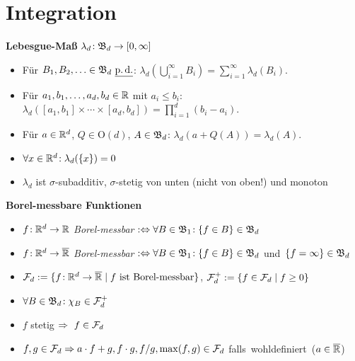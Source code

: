 \section{Integration}

\textbf{Lebesgue-Maß} $\lambda_d\!: \mathfrak{B}_d \to [0,\infty]$
\begin{itemize}
\item Für $B_1,B_2,\ldots\in\B_d\ \pd$:\:
  $\lambda_d(\bigcup_{i=1}^{\infty} B_i) = \sum_{i=1}^{\infty} \lambda_d(B_i)$.

\item Für $a_1,b_1,\ldots,a_d,b_d\in\mathbb{R}$ mit $a_i \leq b_i$:\:\:
  \mbox{$\lambda_d([a_1,b_1] \times\cdots\times [a_d,b_d]) =
  \prod_{i=1}^{d} (b_i-a_i)$.}

\item Für $a\in\mathbb{R}^d$, $Q\in\mathrm{O}(d)$, $A\in\mathfrak{B}_d$:
  $\lambda_d(a+Q(A)) = \lambda_d(A)$.

\item $\forall x\in\mathbb{R}^d\!: \lambda_d(\{x\}) = 0$

\item $\lambda_d$ ist $\sigma$-subadditiv, $\sigma$-stetig von unten
  (nicht von oben!) und monoton
\end{itemize}

\textbf{Borel-messbare Funktionen}
\begin{itemize}
\item $f\!: \mathbb{R}^d\to\mathbb{R}$ \textit{Borel-messbar}
  $:\Leftrightarrow \forall B\in\mathfrak{B}_1\!: \{f \in B\} \in\mathfrak{B}_d$

\item $f\!: \mathbb{R}^d\to\overline{\mathbb{R}}$ \textit{Borel-messbar}
  $:\Leftrightarrow \forall B\in\mathfrak{B}_1\!: \{f \in B\} \in\mathfrak{B}_d$
  \mbox{und $\{f = \infty\} \in\mathfrak{B}_d$}

\item $\mathcal{F}_d := \{f\!: \mathbb{R}^d \to \overline{\mathbb{R}} \mid f \text{ ist Borel-messbar}\}$,
  $\mathcal{F}_d^+ := \{f\in\mathcal{F}_d \mid f \geq 0\}$

\item $\forall B\in\mathfrak{B}_d\!: \chi_B\in\mathcal{F}_d^+$

\item $f$ stetig $\Rightarrow\ f\in\mathcal{F}_d$

\item $f,g\in\mathcal{F}_d \Rightarrow a \cdot f + g, f \cdot g, f/g,
  \operatorname{max}(f,g)\in\mathcal{F}_d$ \mbox{falls wohldefiniert ($a\in\overline{\mathbb{R}}$)}
\end{itemize}

